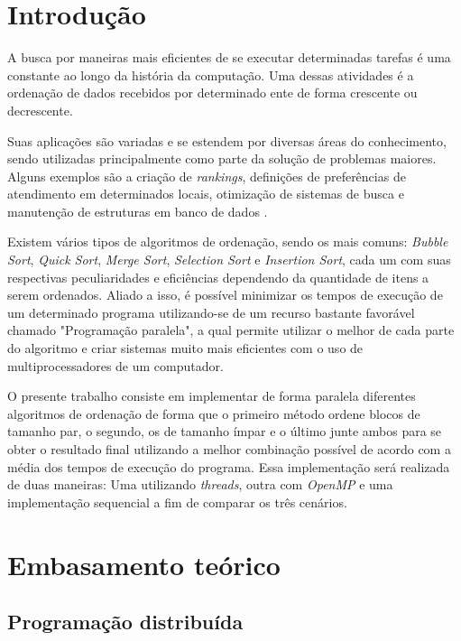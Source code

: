 \section{Introdução}

\indent A busca por maneiras mais eficientes de se executar determinadas tarefas é uma constante ao longo da história da computação. Uma dessas atividades é a ordenação de dados recebidos por determinado ente de forma crescente ou decrescente.

Suas aplicações são variadas e se estendem por diversas áreas do conhecimento, sendo utilizadas principalmente como parte da solução de problemas maiores. Alguns exemplos são a criação de \textit{rankings}, definições de preferências de atendimento em determinados locais, otimização de sistemas de busca e manutenção de estruturas em banco de dados \cite{zanoni}.

Existem vários tipos de algoritmos de ordenação, sendo os mais comuns: \textit{Bubble Sort}, \textit{Quick Sort}, \textit{Merge Sort}, \textit{Selection Sort} e \textit{Insertion Sort}, cada um com suas respectivas peculiaridades e eficiências dependendo da quantidade de itens a serem ordenados. Aliado a isso, é possível minimizar os tempos de execução de um determinado programa utilizando-se de um recurso bastante favorável chamado "Programação paralela", a qual permite utilizar o melhor de cada parte do algoritmo e criar sistemas muito mais eficientes com o uso de multiprocessadores de um computador.\cite{cormen}

O presente trabalho consiste em implementar de forma paralela diferentes algoritmos de ordenação de forma que o primeiro método ordene blocos de tamanho par, o segundo, os de tamanho ímpar e o último junte ambos para se obter o resultado final utilizando a melhor combinação possível de acordo com a média dos tempos de execução do programa. Essa implementação será realizada de duas maneiras: Uma utilizando \textit{threads}, outra com \textit{OpenMP} e uma implementação sequencial a fim de comparar os três cenários.



\section{Embasamento teórico}

\subsection{Programação distribuída}

